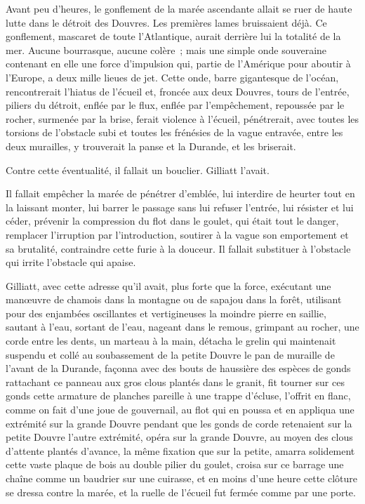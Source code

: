 \documentclass[french,twoside]{book} %
\begin{document}
Avant peu d’heures, le gonflement de la marée ascendante allait se ruer de haute lutte dans le détroit des Douvres. Les premières lames bruissaient déjà. Ce gonflement, mascaret de toute l’Atlantique, aurait derrière lui la totalité de la mer. Aucune bourrasque, aucune colère ; mais une simple onde souveraine contenant en elle une force d’impulsion qui, partie de  l’Amérique pour aboutir à l’Europe, a deux mille lieues de jet. Cette onde, barre gigantesque de l’océan, rencontrerait l’hiatus de l’écueil et, froncée aux deux Douvres, tours de l’entrée, piliers du détroit, enflée par le flux, enflée par l’empêchement, repoussée par le rocher, surmenée par la brise, ferait violence à l’écueil, pénétrerait, avec toutes les torsions de l’obstacle subi et toutes les frénésies de la vague entravée, entre les deux murailles, y trouverait la panse et la Durande, et les briserait.\par
Contre cette éventualité, il fallait un bouclier. Gilliatt l’avait.\par
Il fallait empêcher la marée de pénétrer d’emblée, lui interdire de heurter tout en la laissant monter, lui barrer le passage sans lui refuser l’entrée, lui résister et lui céder, prévenir la compression du flot dans le goulet, qui était tout le danger, remplacer l’irruption par l’introduction, soutirer à la vague son emportement et sa brutalité, contraindre cette furie à la douceur. Il fallait substituer à l’obstacle qui irrite l’obstacle qui apaise.\par
Gilliatt, avec cette adresse qu’il avait, plus forte que la force, exécutant une manœuvre de chamois dans la montagne ou de sapajou dans la forêt, utilisant pour des enjambées oscillantes et vertigineuses la moindre pierre en saillie, sautant à l’eau, sortant de l’eau, nageant dans le remous, grimpant au rocher, une corde entre les dents, un marteau à la main, détacha le grelin qui maintenait suspendu et collé au soubassement de la petite Douvre le pan de muraille  de l’avant de la Durande, façonna avec des bouts de haussière des espèces de gonds rattachant ce panneau aux gros clous plantés dans le granit, fit tourner sur ces gonds cette armature de planches pareille à une trappe d’écluse, l’offrit en flanc, comme on fait d’une joue de gouvernail, au flot qui en poussa et en appliqua une extrémité sur la grande Douvre pendant que les gonds de corde retenaient sur la petite Douvre l’autre extrémité, opéra sur la grande Douvre, au moyen des clous d’attente plantés d’avance, la même fixation que sur la petite, amarra solidement cette vaste plaque de bois au double pilier du goulet, croisa sur ce barrage une chaîne comme un baudrier sur une cuirasse, et en moins d’une heure cette clôture se dressa contre la marée, et la ruelle de l’écueil fut fermée comme par une porte.\par
\end{document}
